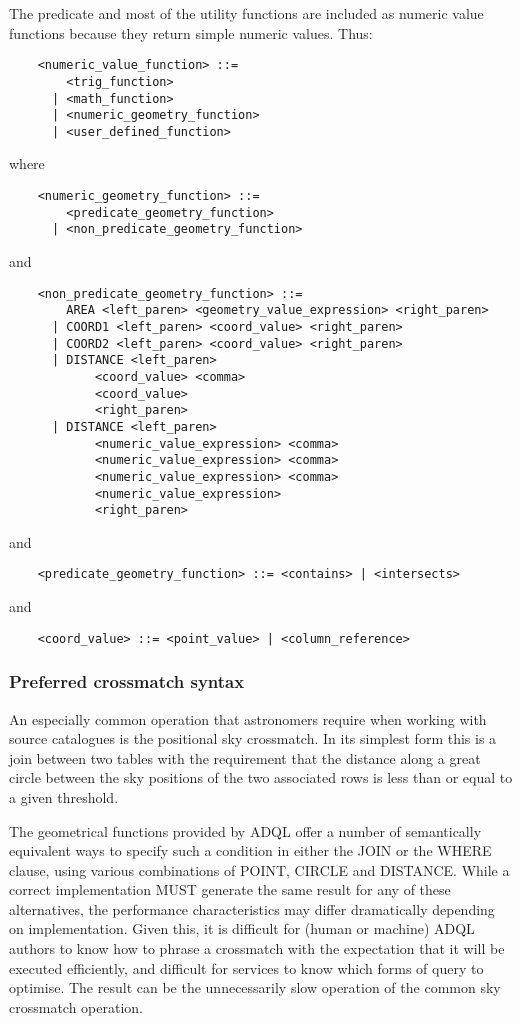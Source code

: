 \documentclass[11pt,a4paper]{ivoa}
\begin{document}
The predicate and most of the utility functions are included as numeric
value functions because they return simple numeric values.
Thus:
\begin{verbatim}
    <numeric_value_function> ::=
        <trig_function>
      | <math_function>
      | <numeric_geometry_function>
      | <user_defined_function>
\end{verbatim}
\noindent
where
\begin{verbatim}
    <numeric_geometry_function> ::=
        <predicate_geometry_function>
      | <non_predicate_geometry_function>
\end{verbatim}
\noindent
and
\begin{verbatim}
    <non_predicate_geometry_function> ::=
        AREA <left_paren> <geometry_value_expression> <right_paren>
      | COORD1 <left_paren> <coord_value> <right_paren>
      | COORD2 <left_paren> <coord_value> <right_paren>
      | DISTANCE <left_paren>
            <coord_value> <comma>
            <coord_value>
            <right_paren>
      | DISTANCE <left_paren>
            <numeric_value_expression> <comma>
            <numeric_value_expression> <comma>
            <numeric_value_expression> <comma>
            <numeric_value_expression>
            <right_paren>
\end{verbatim}
\noindent
and
\begin{verbatim}
    <predicate_geometry_function> ::= <contains> | <intersects>
\end{verbatim}
\noindent
and
\begin{verbatim}
    <coord_value> ::= <point_value> | <column_reference>
\end{verbatim}

\subsubsection{Preferred crossmatch syntax}
\label{sec:functions.geom.crossmatch}

An especially common operation that astronomers require when working
with source catalogues is the positional sky crossmatch.
In its simplest form this is a join between two tables with the
requirement that the distance along a great circle between the
sky positions of the two associated rows is less than or equal to
a given threshold.

The geometrical functions provided by ADQL offer a number of
semantically equivalent ways to specify such a condition
in either the JOIN or the WHERE clause, using various
combinations of POINT, CIRCLE and DISTANCE.
While a correct implementation MUST generate the same result for
any of these alternatives, the performance characteristics may
differ dramatically depending on implementation.
Given this, it is difficult for (human or machine) ADQL authors
to know how to phrase a crossmatch with the expectation that it
will be executed efficiently, and difficult for services to know
which forms of query to optimise.  The result can be the
unnecessarily slow operation of the common sky crossmatch operation.
\end{document}
